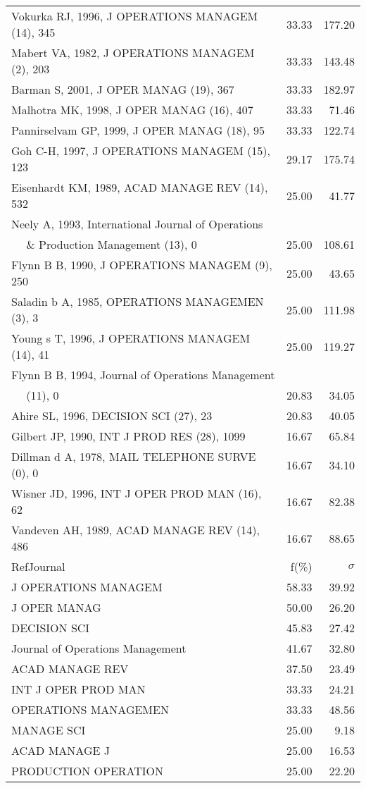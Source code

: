 \documentclass[a4paper,11pt]{report}
\begin{document}
\begin{landscape}
\begin{table}[!ht]
{\begin{tabular}{|l r r|}
Vokurka RJ, 1996, J OPERATIONS MANAGEM (14), 345 & 33.33 & 177.20\\
Mabert VA, 1982, J OPERATIONS MANAGEM (2), 203 & 33.33 & 143.48\\
Barman S, 2001, J OPER MANAG (19), 367 & 33.33 & 182.97\\
Malhotra MK, 1998, J OPER MANAG (16), 407 & 33.33 & 71.46\\
Pannirselvam GP, 1999, J OPER MANAG (18), 95 & 33.33 & 122.74\\
Goh C-H, 1997, J OPERATIONS MANAGEM (15), 123 & 29.17 & 175.74\\
Eisenhardt KM, 1989, ACAD MANAGE REV (14), 532 & 25.00 & 41.77\\
Neely A, 1993, International Journal of Operations &  & \\
$\quad$ \& Production Management (13), 0 & 25.00 & 108.61\\
Flynn B B, 1990, J OPERATIONS MANAGEM (9), 250 & 25.00 & 43.65\\
Saladin b A, 1985, OPERATIONS MANAGEMEN (3), 3 & 25.00 & 111.98\\
Young s T, 1996, J OPERATIONS MANAGEM (14), 41 & 25.00 & 119.27\\
Flynn B B, 1994, Journal of Operations Management &  & \\
$\quad$ (11), 0 & 20.83 & 34.05\\
Ahire SL, 1996, DECISION SCI (27), 23 & 20.83 & 40.05\\
Gilbert JP, 1990, INT J PROD RES (28), 1099 & 16.67 & 65.84\\
Dillman d A, 1978, MAIL TELEPHONE SURVE (0), 0 & 16.67 & 34.10\\
Wisner JD, 1996, INT J OPER PROD MAN (16), 62 & 16.67 & 82.38\\
Vandeven AH, 1989, ACAD MANAGE REV (14), 486 & 16.67 & 88.65\\
\hline
\hline
RefJournal & f(\%) & $\sigma$\\
\hline
J OPERATIONS MANAGEM & 58.33 & 39.92\\
J OPER MANAG & 50.00 & 26.20\\
DECISION SCI & 45.83 & 27.42\\
Journal of Operations Management & 41.67 & 32.80\\
ACAD MANAGE REV & 37.50 & 23.49\\
INT J OPER PROD MAN & 33.33 & 24.21\\
OPERATIONS MANAGEMEN & 33.33 & 48.56\\
MANAGE SCI & 25.00 & 9.18\\
ACAD MANAGE J & 25.00 & 16.53\\
PRODUCTION OPERATION & 25.00 & 22.20\\
\hline
\end{tabular}
}
\end{table}

\end{landscape}
\end{document}
